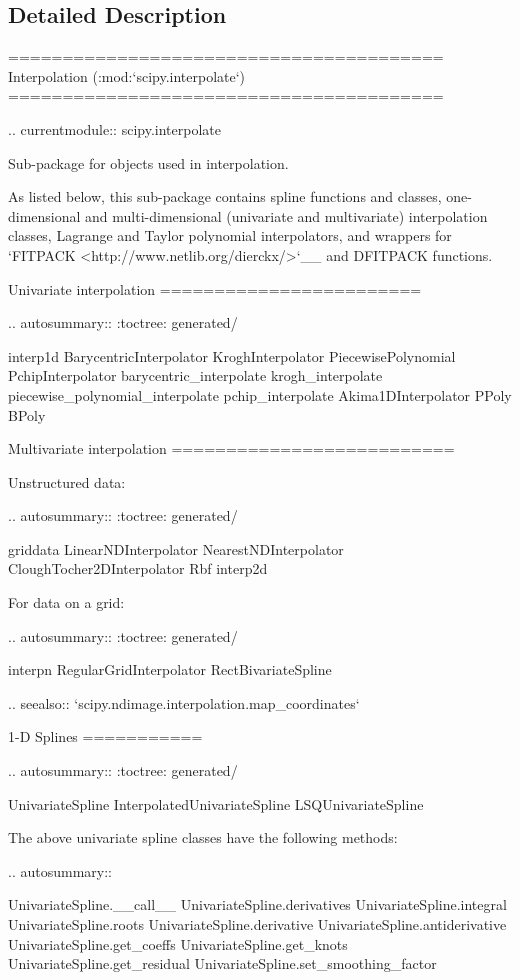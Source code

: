\subsection{Detailed Description}
\begin{DoxyVerb}========================================
Interpolation (:mod:`scipy.interpolate`)
========================================

.. currentmodule:: scipy.interpolate

Sub-package for objects used in interpolation.

As listed below, this sub-package contains spline functions and classes,
one-dimensional and multi-dimensional (univariate and multivariate)
interpolation classes, Lagrange and Taylor polynomial interpolators, and
wrappers for `FITPACK <http://www.netlib.org/dierckx/>`__
and DFITPACK functions.

Univariate interpolation
========================

.. autosummary::
   :toctree: generated/

   interp1d
   BarycentricInterpolator
   KroghInterpolator
   PiecewisePolynomial
   PchipInterpolator
   barycentric_interpolate
   krogh_interpolate
   piecewise_polynomial_interpolate
   pchip_interpolate
   Akima1DInterpolator
   PPoly
   BPoly


Multivariate interpolation
==========================

Unstructured data:

.. autosummary::
   :toctree: generated/

   griddata
   LinearNDInterpolator
   NearestNDInterpolator
   CloughTocher2DInterpolator
   Rbf
   interp2d

For data on a grid:

.. autosummary::
   :toctree: generated/

   interpn
   RegularGridInterpolator
   RectBivariateSpline

.. seealso:: `scipy.ndimage.interpolation.map_coordinates`


1-D Splines
===========

.. autosummary::
   :toctree: generated/

   UnivariateSpline
   InterpolatedUnivariateSpline
   LSQUnivariateSpline

The above univariate spline classes have the following methods:

.. autosummary::

   UnivariateSpline.__call__
   UnivariateSpline.derivatives
   UnivariateSpline.integral
   UnivariateSpline.roots
   UnivariateSpline.derivative
   UnivariateSpline.antiderivative
   UnivariateSpline.get_coeffs
   UnivariateSpline.get_knots
   UnivariateSpline.get_residual
   UnivariateSpline.set_smoothing_factor



\end{DoxyVerb}

